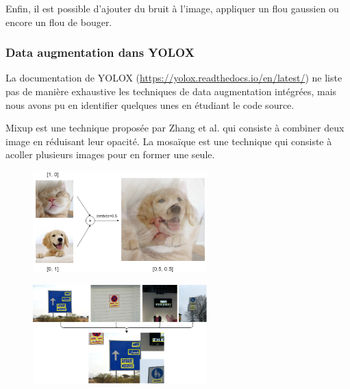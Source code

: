 Enfin, il est possible d'ajouter du bruit à l'image, appliquer un flou gaussien ou encore 
un flou de bouger. 

\subsubsection{Data augmentation dans YOLOX}

La documentation de YOLOX (\url{https://yolox.readthedocs.io/en/latest/}) ne liste pas de manière 
exhaustive les techniques de data augmentation intégrées, mais nous avons pu en identifier quelques unes
en étudiant le code source. 

Mixup est une technique proposée par Zhang et al. \cite{Zhang_Cisse_Dauphin_Lopez} qui consiste à combiner
deux image en réduisant leur opacité. La mosaïque est une technique qui consiste à 
acoller plusieurs images pour en former une seule.

\begin{figure}[H]
    \centering
    \begin{minipage}{.5\textwidth}
      \centering
      \includegraphics[width=0.6\textwidth]{./img/mixup_augmentation.png}
      \label{fig:test1}
    \end{minipage}%
    \begin{minipage}{.5\textwidth}
      \centering
      \includegraphics[width=0.6\textwidth]{./img/mosaic_augmentation.png}
      \label{fig:test2}
    \end{minipage}
\end{figure}

